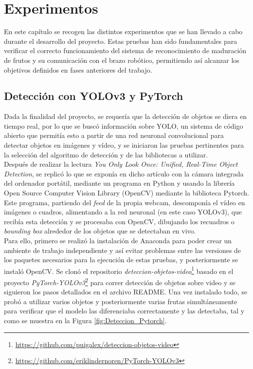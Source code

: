 \chapter{Experimentos}
\label{cap:capitulo6}

En este capítulo se recogen las distintos experimentos que se han llevado a cabo durante el desarrollo del proyecto. Estas pruebas han sido fundamentales para verificar el correcto funcionamiento del sistema de reconocimiento de maduración de frutos y su comunicación con el brazo robótico, permitiendo así alcanzar los objetivos definidos en fases anteriores del trabajo.

\section{Detección con YOLOv3 y PyTorch}
\label{exp_seleccion_algoritmo}

Dada la finalidad del proyecto, se requería que la detección de objetos se diera en tiempo real, por lo que se buscó información sobre YOLO, un sistema de código abierto que permitía esto a partir de una red neuronal convolucional para detectar objetos en imágenes y vídeo, y se iniciaron las pruebas pertinentes para la selección del algoritmo de detección y de las bibliotecas a utilizar.\\

Después de realizar la lectura \textit{You Only Look Once: Unified, Real-Time Object Detection}\cite{Redmon16}, se replicó lo que se exponía en dicho artículo con la cámara integrada del ordenador portátil, mediante un programa en Python y usando la librería Open Source Computer Vision Library (OpenCV) mediante la biblioteca Pytorch. Este programa, partiendo del \textit{feed} de la propia webcam, descomponía el vídeo en imágenes o cuadros, alimentando a la red neuronal (en este caso YOLOv3), que recibía esta detección y se procesaba con OpenCV, dibujando los recuadros o \textit{bounding box} alrededor de los objetos que se detectaban en vivo.\\

Para ello, primero se realizó la instalación de Anaconda para poder crear un ambiente de trabajo independiente y así evitar problemas entre las versiones de los paquetes necesarios para la ejecución de estas pruebas, y posteriormente se instaló OpenCV. Se clonó el repositorio \textit{deteccion-objetos-video}\footnote{\url{https://github.com/puigalex/deteccion-objetos-video}} basado en el proyecto \textit{PyTorch-YOLOv3}\footnote{\url{https://github.com/eriklindernoren/PyTorch-YOLOv3}} para correr detección de objetos sobre video y se siguieron los pasos detallados en el archivo README.
Una vez instalado todo, se probó a utilizar varios objetos y posteriormente varias frutas simultáneamente para verificar que el modelo las diferenciaba correctamente y las detectaba, tal y como se muestra en la Figura \ref{fig:Deteccion_Pytorch}.

